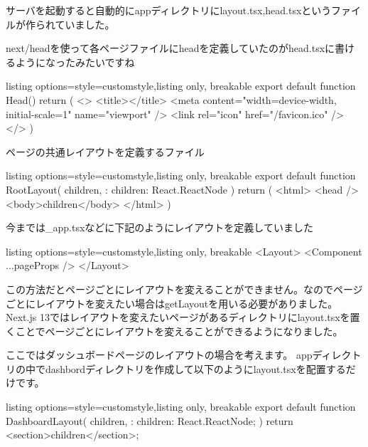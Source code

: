 サーバを起動すると自動的にappディレクトリにlayout.tsx,head.tsxというファイルが作られていました。

next/headを使って各ページファイルにheadを定義していたのがhead.tsxに書けるようになったみたいですね

\begin{tcblisting}{listing options={style=customstyle},listing only, breakable}
  export default function Head() {
      return (
      <>
      <title></title>
      <meta content="width=device-width, initial-scale=1" name="viewport" />
      <link rel="icon" href="/favicon.ico" />
      </>
      )
    }
\end{tcblisting}



ページの共通レイアウトを定義するファイル




\begin{tcblisting}{listing options={style=customstyle},listing only, breakable}
  export default function RootLayout({
      children,
    }: {
  children: React.ReactNode
  }) {
      return (
      <html>
        <head />
        <body>{children}</body>
      </html>
      )
    }

\end{tcblisting}


今までは\_app.tsxなどに下記のようにレイアウトを定義していました
\begin{tcblisting}{listing options={style=customstyle},listing only, breakable}
  <Layout>
  <Component {...pageProps} />
  </Layout>
\end{tcblisting}




この方法だとページごとにレイアウトを変えることができません。なのでページごとにレイアウトを変えたい場合はgetLayoutを用いる必要がありました。Next.js 13ではレイアウトを変えたいページがあるディレクトリにlayout.tsxを置くことでページごとにレイアウトを変えることができるようになりました。


ここではダッシュボードページのレイアウトの場合を考えます。
appディレクトリの中でdashbordディレクトリを作成して以下のようにlayout.tsxを配置するだけです。


\begin{tcblisting}{listing options={style=customstyle},listing only, breakable}
  export default function DashboardLayout({
      children,
    }: {
  children: React.ReactNode;
  }) {
      return <section>{children}</section>;
    }
\end{tcblisting}




